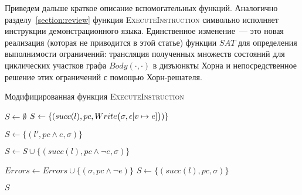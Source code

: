 Приведем дальше краткое описание вспомогательных функций.
Аналогично разделу~\ref{section:review} функция \textsc{ExecuteInstruction} символьно исполняет инструкции демонстрационного языка. Единственное изменение~--- это новая реализация (которая не приводится в этой статье) функции $SAT$ для определения выполнимости ограничений: трансляция полученных множеств состояний для циклических участков графа $Body(\cdot,\cdot)$ в дизъюнкты Хорна и непосредственное решение этих ограничений с помощью Хорн-решателя.

\begin{algorithm}
    \caption{Модифицированная функция \textsc{ExecuteInstruction}} \label{new_execute_instruction}
\begin{algorithmic}[1]
        \State $S \gets \emptyset$
         \label{alg:execute_instruction_start}
                \State $S \gets \{(succ(l),pc, Write\big(\sigma,\epsilon[v\mapsto e]\big))\}$
            \EndCase

                 \label{alg:sat1}
                    \State $S \gets \{(l', pc \land e, \sigma)\}$
                \EndIf

                 \label{alg:sat2}
                    \State $S \gets S \cup \{(succ(l), pc \land \neg e, \sigma)\}$
                \EndIf
            \EndCase

                 \label{alg:sat3}
                    \State $Errors \gets Errors \cup \{(\sigma, pc \land \neg e)\}$
                \Else
                    \State $S \gets \{(succ(l),pc,\sigma)\}$
                \EndIf
            \EndCase

            \EndCase
        \EndSwitch \label{alg:execute_instruction_end}
        \State \Return $S$
    \EndProcedure
\end{algorithmic}
\end{algorithm}

